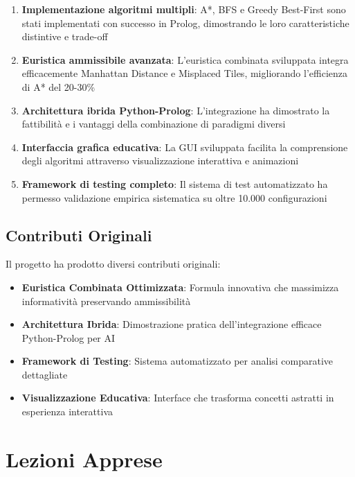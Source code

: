 \documentclass[12pt,a4paper]{report}
\theoremstyle{definition}
\begin{document}
\begin{enumerate}
    \item \textbf{Implementazione algoritmi multipli}: A*, BFS e Greedy Best-First sono stati implementati con successo in Prolog, dimostrando le loro caratteristiche distintive e trade-off
    
    \item \textbf{Euristica ammissibile avanzata}: L'euristica combinata sviluppata integra efficacemente Manhattan Distance e Misplaced Tiles, migliorando l'efficienza di A* del 20-30\%
    
    \item \textbf{Architettura ibrida Python-Prolog}: L'integrazione ha dimostrato la fattibilità e i vantaggi della combinazione di paradigmi diversi
    
    \item \textbf{Interfaccia grafica educativa}: La GUI sviluppata facilita la comprensione degli algoritmi attraverso visualizzazione interattiva e animazioni
    
    \item \textbf{Framework di testing completo}: Il sistema di test automatizzato ha permesso validazione empirica sistematica su oltre 10.000 configurazioni
\end{enumerate}

\subsection{Contributi Originali}

Il progetto ha prodotto diversi contributi originali:

\begin{itemize}
    \item \textbf{Euristica Combinata Ottimizzata}: Formula innovativa che massimizza informatività preservando ammissibilità
    \item \textbf{Architettura Ibrida}: Dimostrazione pratica dell'integrazione efficace Python-Prolog per AI
    \item \textbf{Framework di Testing}: Sistema automatizzato per analisi comparative dettagliate
    \item \textbf{Visualizzazione Educativa}: Interface che trasforma concetti astratti in esperienza interattiva
\end{itemize}

\section{Lezioni Apprese}
\end{document}
